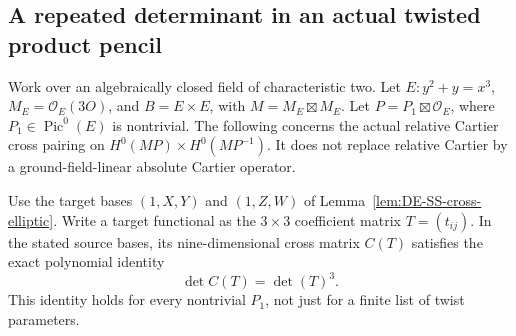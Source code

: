 \subsection{A repeated determinant in an actual twisted product pencil}

Work over an algebraically closed field of characteristic two. Let
\(E:y^2+y=x^3\), \(M_E=\mathcal O_E(3O)\), and
\(B=E\times E\), with \(M=M_E\boxtimes M_E\).
Let \(P=P_1\boxtimes\mathcal O_E\), where
\(P_1\in\operatorname{Pic}^0(E)\) is nontrivial. The following
concerns the actual relative Cartier cross pairing on
\(H^0(MP)\times H^0(MP^{-1})\). It does not replace relative
Cartier by a ground-field-linear absolute Cartier operator.

\begin{lemma}
\label{lem:ss-product-one-axis-cross-determinant-cube}
Use the target bases \((1,X,Y)\) and \((1,Z,W)\) of
Lemma~\ref{lem:DE-SS-cross-elliptic}. Write a target functional
as the \(3\times3\) coefficient matrix \(T=(t_{ij})\).
In the stated source bases, its nine-dimensional cross matrix
\(C(T)\) satisfies the exact polynomial identity
\[
                        \det C(T)=\det(T)^3.
 \tag{PTC1}
\]
This identity holds for every nontrivial \(P_1\), not just
for a finite list of twist parameters.
\end{lemma}
